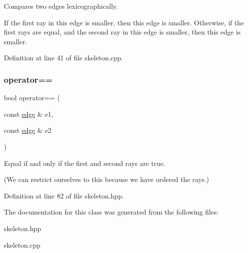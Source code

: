 Compares two edges lexicographically. 

If the first ray in {\ttfamily this} edge is smaller, then {\ttfamily this} edge is smaller. Otherwise, if the first rays are equal, and the second ray in {\ttfamily this} edge is smaller, then {\ttfamily this} edge is smaller. 

Definition at line 41 of file skeleton.\+cpp.

\mbox{\label{classedge_a87086330455166d1fe4bb71be060fbcc}} 
\subsubsection{\texorpdfstring{operator==}{operator==}}
{\footnotesize\ttfamily bool operator== (\begin{DoxyParamCaption}\item[{const \hyperlink{classedge}{edge} \&}]{e1,  }\item[{const \hyperlink{classedge}{edge} \&}]{e2 }\end{DoxyParamCaption})\hspace{0.3cm}{\ttfamily [friend]}}



Equal if and only if the first and second rays are true. 

(We can restrict ourselves to this because we have ordered the rays.) 

Definition at line 82 of file skeleton.\+hpp.



The documentation for this class was generated from the following files\+:\begin{DoxyCompactItemize}
\item 
skeleton.\+hpp\item 
skeleton.\+cpp\end{DoxyCompactItemize}
